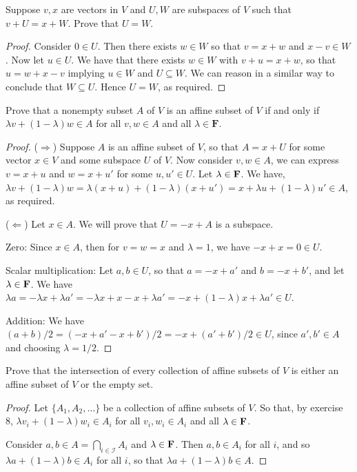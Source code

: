 \begin{exercise}{7}
  Suppose $v, x$ are vectors in $V$ and $U,W$ are subspaces of $V$ such that $v+U=x+W$. Prove that $U=W$.
\end{exercise}
\begin{proof}
 Consider $0\in U$. Then there exists $w\in W$ so that $v=x+w$ and $x-v\in W$. Now let $u\in U$. We have that there exists $w\in W$ with $v+u=x+w$, so that $u=w+x-v$ implying $u\in W$ and $U\subseteq W$. We can reason in a similar way to conclude that $W\subseteq U$. Hence $U=W$, as required.
\end{proof}

\begin{exercise}{8}
  Prove that a nonempty subset $A$ of $V$ is an affine subset of $V$ if and only if $\lambda v+(1-\lambda)w\in A$ for all $v,w\in A$ and all $\lambda\in\mathbf{F}$.
\end{exercise}
\begin{proof}
 ($\Rightarrow$) Suppose $A$ is an affine subset of $V$, so that $A=x+U$ for some vector $x\in V$ and some subspace $U$ of $V$. Now consider $v,w\in A$, we can express $v=x+u$ and $w=x+u'$ for some $u,u'\in U$. Let $\lambda\in\mathbf{F}$. We have, $\lambda v+(1-\lambda)w= \lambda(x+u)+(1-\lambda)(x+u')=x+\lambda u+(1-\lambda)u'\in A$, as required.

 ($\Leftarrow$) Let $x\in A$. We will prove that $U=-x+A$ is a subspace.

 Zero: Since $x\in A$, then for $v=w=x$ and $\lambda=1$, we have $-x+x=0\in U$.

 Scalar multiplication: Let $a,b\in U$, so that $a=-x+a'$ and $b=-x+b'$, and let $\lambda\in\mathbf{F}$. We have $\lambda a=-\lambda x+\lambda a'= -\lambda x+x-x+\lambda a'= -x + (1-\lambda)x+\lambda a'\in U$.

 Addition: We have $(a+b)/2= (-x+a'-x+b')/2= -x+(a'+b')/2\in U$, since $a',b'\in A$ and choosing $\lambda=1/2$.
\end{proof}

\begin{exercise}{10}
  Prove that the intersection of every collection of affine subsets of $V$ is either an affine subset of $V$ or the empty set.
\end{exercise}
\begin{proof}
 Let $\{A_1,A_2,\dots\}$ be a collection of affine subsets of $V$. So that, by exercise 8, $\lambda v_i+(1-\lambda)w_i\in A_i$ for all $v_i,w_i\in A_i$ and all $\lambda\in\mathbf{F}$. 

 Consider $a,b\in A=\bigcap_{i\in\mathcal{I}}A_i$ and $\lambda\in\mathbf{F}$. Then $a,b\in A_i$ for all $i$, and so $\lambda a+(1-\lambda)b\in A_i$ for all $i$, so that $\lambda a+(1-\lambda)b\in A$.
\end{proof}

